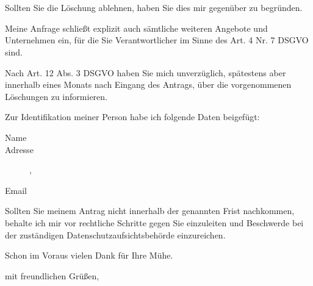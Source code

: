 \documentclass[a4paper, pagenumber=footmiddle, parskip=half,
	foldmarks=true,foldmarks=BmT, fromalign=right,
	fromphone=false, fromfax=false, fromemail=true, fromurl=false, fromlogo=false,
	fromrule=false, version=last]{scrlttr2}
\begin{document}
\begin{letter}{
	\EmpfaengerName\\
	\EmpfaengerStrasse\\
	\EmpfaengerStadt
}
Sollten Sie die Löschung ablehnen, haben Sie dies mir gegenüber zu begründen.

Meine Anfrage schließt explizit auch sämtliche weiteren Angebote und Unternehmen ein, für die Sie Verantwortlicher im Sinne des Art. 4 Nr. 7 DSGVO sind.

Nach Art. 12 Abs. 3 DSGVO haben Sie mich unverzüglich, spätestens aber innerhalb eines Monats nach Eingang des Antrags, über die vorgenommenen Löschungen zu informieren.

\vspace*{15mm}
Zur Identifikation meiner Person habe ich folgende Daten beigefügt:
\begin{description}
	\item[Name] \meinName{}
	\item[Adresse] \meineStrasse{}, \meineStadt{}
	\item[Email] \meineEmail{}  
\end{description}
\vspace*{5mm}

Sollten Sie meinem Antrag nicht innerhalb der genannten Frist nachkommen, behalte ich mir vor rechtliche Schritte gegen Sie einzuleiten und Beschwerde bei der zuständigen Datenschutzaufsichtsbehörde einzureichen.

Schon im Voraus vielen Dank für Ihre Mühe.


\closing{mit freundlichen Grüßen,}


\end{letter}
\end{document}

